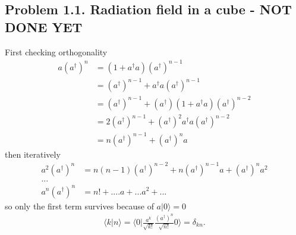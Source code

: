 \documentclass[../main.tex]{subfiles}
\begin{document}
\subsection{Problem 1.1. Radiation field in a cube - NOT DONE YET}
First checking orthogonality
\begin{align}
a(a^\dagger)^n
&=(1+a^\dagger a)(a^\dagger)^{n-1}\\
&=(a^\dagger)^{n-1}+a^\dagger a(a^\dagger)^{n-1}\\
&=(a^\dagger)^{n-1}+(a^\dagger)(1+a^\dagger a)(a^\dagger)^{n-2}\\
&=2(a^\dagger)^{n-1}+(a^\dagger)^2a^\dagger a(a^\dagger)^{n-2}\\
&=n(a^\dagger)^{n-1}+(a^\dagger)^{n}a
\end{align}
then iteratively
\begin{align}
a^2(a^\dagger)^n&=n(n-1)(a^\dagger)^{n-2}+n(a^\dagger)^{n-1}a+(a^\dagger)^na^2\\
...&\\
a^n(a^\dagger)^n&=n!+....a+...a^2+...
\end{align}
so only the first term survives because of $a|0\rangle=0$ 
\begin{align}
\langle k|n\rangle=\langle 0|\frac{a^k}{\sqrt{k!}}\frac{(a^\dagger)^n}{\sqrt{n!}}0\rangle=\delta_{kn}.
\end{align}
\end{document}
